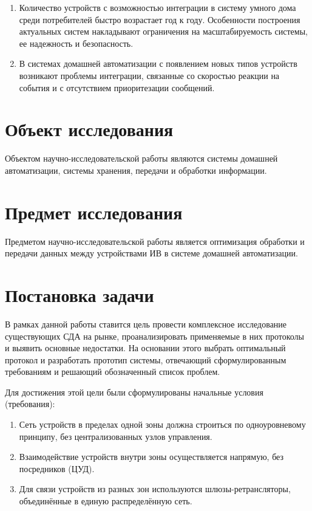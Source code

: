 \documentclass[14pt, a4paper]{extreport}
\begin{document}
\begin{enumerate}
    \item	Количество устройств с возможностью интеграции в систему умного дома среди потребителей быстро возрастает год к году. Особенности построения актуальных систем накладывают
    ограничения на масштабируемость системы, ее надежность и безопасность.

    \item	В системах домашней автоматизации с появлением новых типов устройств возникают проблемы интеграции, связанные со скоростью реакции на события и с отсутствием
    приоритезации сообщений.
\end{enumerate}

\section{Объект исследования}


Объектом научно-исследовательской работы являются системы домашней автоматизации, системы хранения, передачи и обработки информации.


\section{Предмет исследования}



Предметом научно-исследовательской работы является оптимизация обработки и передачи данных между устройствами ИВ в системе домашней автоматизации.

\section{Постановка задачи}


В рамках данной работы ставится цель провести комплексное исследование существующих СДА на рынке, проанализировать применяемые в них протоколы и выявить основные недостатки. На
основании этого выбрать оптимальный протокол и разработать прототип системы, отвечающий сформулированным требованиям и решающий обозначенный список проблем.

Для достижения этой цели были сформулированы начальные условия (требования):

\begin{enumerate}
    \item Сеть устройств в пределах одной зоны должна строиться по одноуровневому принципу, без централизованных узлов управления.
    \item Взаимодействие устройств внутри зоны осуществляется напрямую, без посредников (ЦУД).
    \item Для связи устройств из разных зон используются шлюзы-ретрансляторы, объединённые в единую распределённую сеть.
\end{enumerate}
\end{document}
